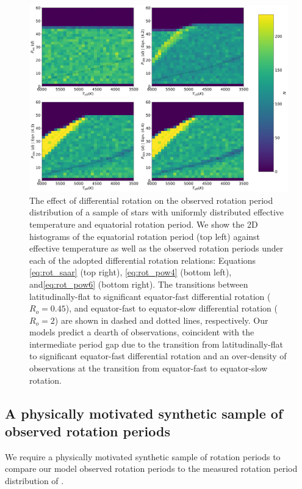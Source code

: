 \begin{figure}
\centering
 \includegraphics[width=\textwidth]{Figures/rot_gap_figures/create_gap.png}
 \caption[The effect of differential rotation on the observed rotation period distribution.]{The effect of differential rotation on the observed rotation period distribution of a sample of stars with uniformly distributed effective temperature and equatorial rotation period. We show the 2D histograms of the equatorial rotation period (top left) against effective temperature as well as the observed rotation periods under each of the adopted differential rotation relations: Equations \ref{eq:rot_saar} (top right), \ref{eq:rot_pow4} (bottom left), and\ref{eq:rot_pow6} (bottom right). The transitions between latitudinally-flat to significant equator-fast differential rotation ($R_o = 0.45$), and equator-fast to equator-slow differential rotation ($R_o = 2$) are shown in dashed and dotted lines, respectively. Our models predict a dearth of observations, coincident with the intermediate period gap due to the transition from latitudinally-flat to significant equator-fast differential rotation and an over-density of observations at the transition from equator-fast to equator-slow rotation.}
 \label{fig:create_gap}
\end{figure}

\subsection{A physically motivated synthetic sample of observed rotation periods}

We require a physically motivated synthetic sample of rotation periods to compare our model observed rotation periods to the measured rotation period distribution of \citet{mcquillan_rotation_2014}.

